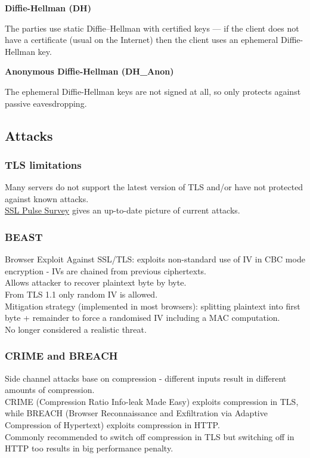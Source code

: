 \documentclass{article}
\begin{document}
\textbf{Diffie-Hellman (DH)}

The parties use static Diffie–Hellman with certified keys — if the client does not have a certificate (usual on the Internet) then the client uses an ephemeral Diffie-Hellman key.

\textbf{Anonymous Diffie-Hellman (DH\_Anon)}

The ephemeral Diffie-Hellman keys are not signed at all, so only protects against passive eavesdropping.

\subsection{Attacks}

\subsubsection{TLS limitations}

Many servers do not support the latest version of TLS and/or have not protected against known attacks.\\
\href{https://www.ssllabs.com/ssl-pulse/}{SSL Pulse Survey} gives an up-to-date picture of current attacks.

\subsubsection{BEAST}

Browser Exploit Against SSL/TLS: exploits non-standard use of IV in CBC mode encryption - IVs are chained from previous ciphertexts.\\
Allows attacker to recover plaintext byte by byte.\\
From TLS 1.1 only random IV is allowed.\\
Mitigation strategy (implemented in most browsers): splitting plaintext into first byte + remainder to force a randomised IV including a MAC computation.\\
No longer considered a realistic threat.

\subsubsection{CRIME and BREACH}

Side channel attacks base on compression - different inputs result in different amounts of compression.\\
CRIME (Compression Ratio Info-leak Made Easy) exploits compression in TLS, while BREACH (Browser Reconnaissance and Exfiltration via Adaptive Compression of Hypertext) exploits compression in HTTP.\\
Commonly recommended to switch off compression in TLS but switching off in HTTP too results in big performance penalty.
\end{document}
